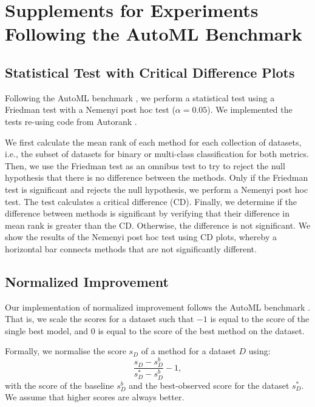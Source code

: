 \documentclass[11pt]{article}
\newcommand{\nbc}[3]{
		{\colorbox{#3}{\bfseries\sffamily\scriptsize\textcolor{white}{#1}}}
		{\textcolor{#3}{\sf\small$\blacktriangleright$\textit{#2}$\blacktriangleleft$}}
}
\newcommand{\changed}[1]{\nbc{CHANGED}{#1}{changedcolor}}
\renewcommand{\changed}[1]{{\color{changedcolor}#1}}
\renewcommand{\changed}[1]{{#1}}
\begin{document}
\changed{
\section{Supplements for Experiments Following the AutoML Benchmark \citep{automl_benchmark_2022}}

\subsection{Statistical Test with Critical Difference Plots}
\label{apdx/cd_plots}
Following the AutoML benchmark \citep{automl_benchmark_2022}, we perform a statistical test using a Friedman test with a Nemenyi post hoc test ($\alpha = 0.05$). We implemented the tests re-using code from Autorank \citep{Herbold2020}.

We first calculate the mean rank of each method for each collection of datasets, i.e., the subset of datasets for binary or multi-class classification for both metrics. 
Then, we use the Friedman test as an omnibus test to try to reject the null hypothesis that there is no difference between the methods. 
Only if the Friedman test is significant and rejects the null hypothesis, we perform a Nemenyi post hoc test. 
The test calculates a critical difference (CD). 
Finally, we determine if the difference between methods is significant by verifying that their difference in mean rank is greater than the CD. Otherwise, the difference is not significant. 
We show the results of the Nemenyi post hoc test using CD plots, whereby a horizontal bar connects methods that are not significantly different. 

\subsection{Normalized Improvement}
\label{apdx/norm_improvement}
Our implementation of normalized improvement follows the AutoML benchmark \citep{automl_benchmark_2022}.
That is, we scale the scores for a dataset such that $-1$ is equal to the score of the single best model, and $0$ is equal to the score of the best method on the dataset.

Formally, we normalise the score $s_{D}$ of a method for a dataset $D$ using:  
\begin{equation}
    \frac{s_{D} - s_{D}^{b}}{s_{D}^* - s_{D}^{b}} - 1, 
\end{equation}
with the score of the baseline $s_{D}^{b}$ and the best-observed score for the dataset $s_{D}^*$.
We assume that higher scores are always better. 
 
}
\end{document}
